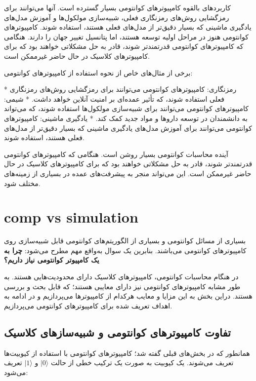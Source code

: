 \documentclass{book}
\begin{document}
کاربردهای بالقوه کامپیوترهای کوانتومی بسیار گسترده است. آنها می‌توانند برای رمزگشایی روش‌های رمزنگاری فعلی، شبیه‌سازی مولکول‌ها و آموزش مدل‌های یادگیری ماشینی که بسیار دقیق‌تر از مدل‌های فعلی هستند، استفاده شوند. کامپیوترهای کوانتومی هنوز در مراحل اولیه توسعه هستند، اما پتانسیل تغییر جهان را دارند. هنگامی که کامپیوترهای کوانتومی قدرتمندتر شوند، قادر به حل مشکلاتی خواهند بود که برای کامپیوترهای کلاسیک در حال حاضر غیرممکن است.

 برخی از مثال‌های خاص از نحوه استفاده از کامپیوترهای کوانتومی:

* رمزنگاری: کامپیوترهای کوانتومی می‌توانند برای رمزگشایی روش‌های رمزنگاری فعلی استفاده شوند، که تأثیر عمده‌ای بر امنیت آنلاین خواهد داشت.
* شیمی: کامپیوترهای کوانتومی می‌توانند برای شبیه‌سازی مولکول‌ها استفاده شوند، که می‌تواند به دانشمندان در توسعه داروها و مواد جدید کمک کند.
* یادگیری ماشینی: کامپیوترهای کوانتومی می‌توانند برای آموزش مدل‌های یادگیری ماشینی که بسیار دقیق‌تر از مدل‌های فعلی هستند، استفاده شوند.

آینده محاسبات کوانتومی بسیار روشن است. هنگامی که کامپیوترهای کوانتومی قدرتمندتر شوند، قادر به حل مشکلاتی خواهند بود که برای کامپیوترهای کلاسیک در حال حاضر غیرممکن است. این می‌تواند منجر به پیشرفت‌های عمده در بسیاری از زمینه‌های مختلف شود.
\section{comp vs simulation}

بسیاری از مسائل کوانتومی و بسیاری از الگوریتم‌های کوانتومی قابل شبیه‌سازی روی کامپیوتر‌های کوانتومی می‌باشند. بنابرین یک سوال به‌واقع مهم مطرح می‌شود: \textbf{چرا به یک کامپیوتر کوانتومی نیاز داریم؟}

در هنگام محاسبات کوانتومی،‌ کامپیوتر‌های کلاسیک دارای محدودیت‌هایی هستند. به طور مشابه کامپیوتر‌های کوانتومی نیز دارای معایبی هستند؛ که قابل بحث و بررسی هستند. دراین بخش به این مزایا و معایب هرکدام از کامپیوترها می‌پردازیم و در ادامه به اهداف تعریف شده برای کامپیوترهای کوانتومی می‌پردازیم.


\subsection{تفاوت کامپیوترهای کوانتومی و شبیه‌سازهای کلاسیک}
همانطور که در بخش‌های قبلی گفته شد؛ کامپیوترهای کوانتومی با استفاده از کیوبیت‌ها تعریف می‌شوند. یک کیوبیت به صورت یک ترکیب خطی از حالت $\vert0\rangle$ و $\vert1\rangle$ تعریف می‌شود:
\end{document}
